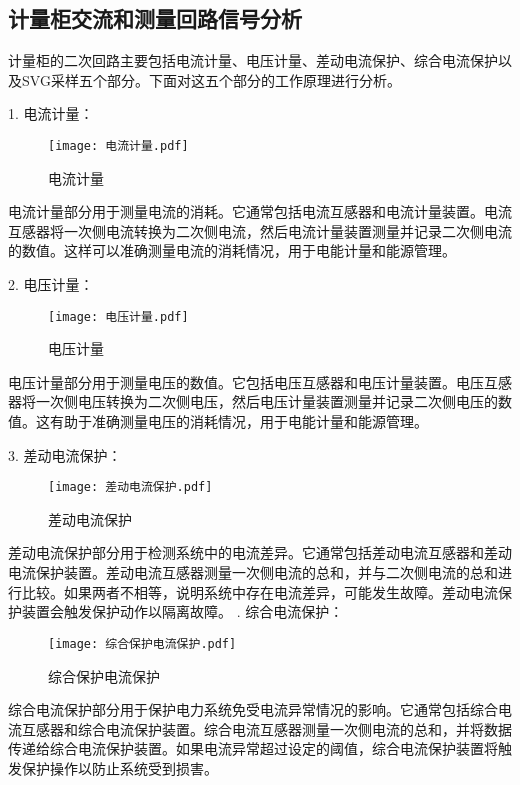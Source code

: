 \subsection{计量柜交流和测量回路信号分析}

计量柜的二次回路主要包括电流计量、电压计量、差动电流保护、综合电流保护以及SVG采样五个部分。下面对这五个部分的工作原理进行分析。

1. 电流计量：

\begin{figure}[h]
	\centering
	\texttt{[image: 电流计量.pdf]}
	\caption{电流计量}
	\label{电流计量}
\end{figure}

电流计量部分用于测量电流的消耗。它通常包括电流互感器和电流计量装置。电流互感器将一次侧电流转换为二次侧电流，然后电流计量装置测量并记录二次侧电流的数值。这样可以准确测量电流的消耗情况，用于电能计量和能源管理。

2. 电压计量：

\begin{figure}[h]
	\centering
	\texttt{[image: 电压计量.pdf]}
	\caption{电压计量}
	\label{电压计量}
\end{figure}

电压计量部分用于测量电压的数值。它包括电压互感器和电压计量装置。电压互感器将一次侧电压转换为二次侧电压，然后电压计量装置测量并记录二次侧电压的数值。这有助于准确测量电压的消耗情况，用于电能计量和能源管理。

3. 差动电流保护：

\begin{figure}[h]
	\centering
	\texttt{[image: 差动电流保护.pdf]}
	\caption{差动电流保护}
	\label{差动电流保护}
\end{figure}

差动电流保护部分用于检测系统中的电流差异。它通常包括差动电流互感器和差动电流保护装置。差动电流互感器测量一次侧电流的总和，并与二次侧电流的总和进行比较。如果两者不相等，说明系统中存在电流差异，可能发生故障。差动电流保护装置会触发保护动作以隔离故障。
. 综合电流保护：

\begin{figure}[h]
	\centering
	\texttt{[image: 综合保护电流保护.pdf]}
	\caption{综合保护电流保护}
	\label{综合保护电流保护}
\end{figure}

综合电流保护部分用于保护电力系统免受电流异常情况的影响。它通常包括综合电流互感器和综合电流保护装置。综合电流互感器测量一次侧电流的总和，并将数据传递给综合电流保护装置。如果电流异常超过设定的阈值，综合电流保护装置将触发保护操作以防止系统受到损害。

